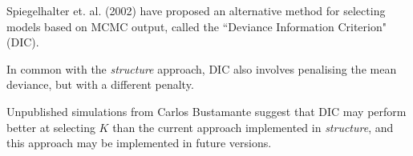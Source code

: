 


Spiegelhalter et. al. (2002) have proposed an alternative method
for selecting models based on MCMC output, called the ``Deviance
Information Criterion" (DIC).

In common with the {\sl structure} approach, DIC also
involves penalising the mean deviance, but with a different penalty.

Unpublished simulations from Carlos Bustamante suggest that DIC may
perform better at selecting $K$ than the current approach implemented
in {\sl structure}, and this approach may be implemented in future versions.


%





%

%

